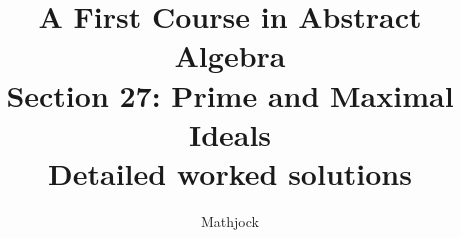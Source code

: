 
\title{\textbf{A First Course in Abstract Algebra}\\[0.3em]Section 27: Prime and Maximal Ideals\\[0.3em]\large Detailed worked solutions}
\author{Mathjock}
\date{}

\maketitle
\bookinfo
\tableofcontents
\clearpage
\renewcommand{\thesection}{27}
\renewcommand{\theHsection}{fraleigh.27}


